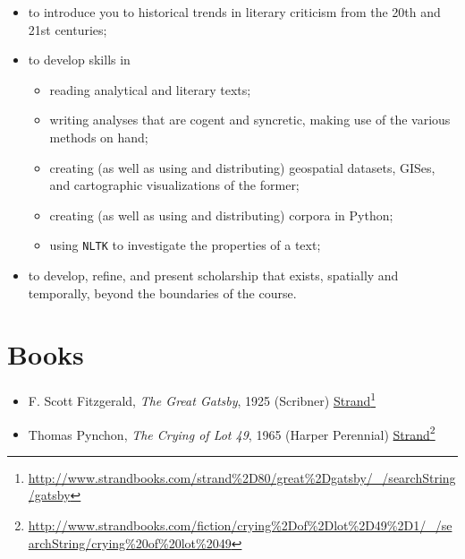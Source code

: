\begin{itemize}
\item to introduce you to historical trends in literary criticism from the 20th and 21st centuries;

\item to develop skills in

\begin{itemize}
\item reading analytical and literary texts;

\item writing analyses that are cogent and syncretic, making use of the various methods on hand;

\item creating (as well as using and distributing) geospatial datasets,
 GISes, and cartographic visualizations of the former;

\item creating (as well as using and distributing) corpora in Python;

\item using \texttt{NLTK} to investigate the properties of a text;

\end{itemize}

\item to develop, refine, and present scholarship that exists, spatially and
temporally, beyond the boundaries of the course.

\end{itemize}

\chapter{Books}
\label{books}

\begin{itemize}
\item F. Scott Fitzgerald, \emph{The Great Gatsby}, 1925 (Scribner) \href{http://www.strandbooks.com/strand%2D80/great%2Dgatsby/_/searchString/gatsby}{Strand}\footnote{\href{http://www.strandbooks.com/strand\%2D80/great\%2Dgatsby/\_/searchString/gatsby}{http:/\slash www.strandbooks.com\slash strand\%2D80\slash great\%2Dgatsby\slash \_\slash searchString\slash gatsby}}

\item Thomas Pynchon, \emph{The Crying of Lot 49}, 1965 (Harper Perennial) \href{http://www.strandbooks.com/fiction/crying%2Dof%2Dlot%2D49%2D1/_/searchString/crying%20of%20lot%2049}{Strand}\footnote{\href{http://www.strandbooks.com/fiction/crying\%2Dof\%2Dlot\%2D49\%2D1/\_/searchString/crying\%20of\%20lot\%2049}{http:/\slash www.strandbooks.com\slash fiction\slash crying\%2Dof\%2Dlot\%2D49\%2D1\slash \_\slash searchString\slash crying\%20of\%20lot\%2049}}

\end{itemize}

